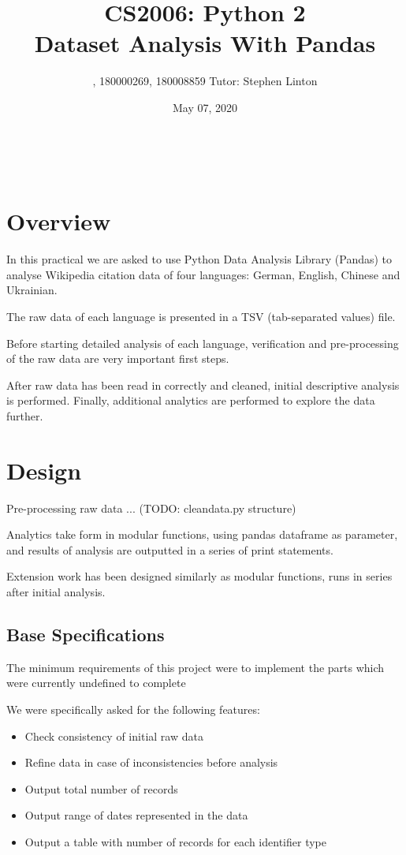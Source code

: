 \documentclass[12pt,a4paper,final]{article}
\begin{document}
\title{%
    CS2006: Python 2 \\
    \Large Dataset Analysis With Pandas} \\
\author{, 180000269, 180008859 Tutor: Stephen Linton}
\date{May 07, 2020}
\maketitle

\section*{Overview}
In this practical we are asked to use Python Data Analysis Library (Pandas) to analyse Wikipedia citation data of four languages: German, English, Chinese and Ukrainian.

The raw data of each language is presented in a TSV (tab-separated values) file.

Before starting detailed analysis of each language, verification and pre-processing of the raw data are very important first steps.

After raw data has been read in correctly and cleaned, initial descriptive analysis is performed. Finally, additional analytics are performed to explore the data further.

\section*{Design}
Pre-processing raw data ... (TODO: cleandata.py structure)

Analytics take form in modular functions, using pandas dataframe as parameter, and results of analysis are outputted in a series of print statements.

Extension work has been designed similarly as modular functions, runs in series after initial analysis.

\subsection*{Base Specifications}

The minimum requirements of this project were to implement the parts which were currently undefined
to complete

We were specifically asked for the following features:

\begin{itemize}[noitemsep]
    \item Check consistency of initial raw data
    \item Refine data in case of inconsistencies before analysis
    \item Output total number of records
    \item Output range of dates represented in the data
    \item Output a table with number of records for each identifier type
\end{itemize}
\end{document}
